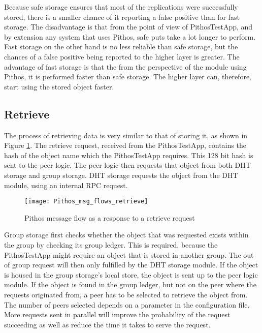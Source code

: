 Because safe storage ensures that most of the replications were successfully stored, there is a smaller chance of it reporting a false positive than for fast storage. The disadvantage is that from the point of view of PithosTestApp, and by extension any system that uses Pithos, safe puts take a lot longer to perform. Fast storage on the other hand is no less reliable than safe storage, but the chances of a false positive being reported to the higher layer is greater. The advantage of fast storage is that the from the perspective of the module using Pithos, it is performed faster than safe storage. The higher layer can, therefore, start using the stored object faster.
\subsection{Retrieve}
   The process of retrieving data is very similar to that of storing it, as shown in Figure \ref{fig_pithos_msg_flow_retrieve}. The retrieve request, received from the PithosTestApp, contains the hash of the object name which the PithosTestApp requires. This 128 bit hash is sent to the peer logic. The peer logic then requests that object from both DHT storage and group storage. DHT storage requests the object from the DHT module, using an internal RPC request.

\begin{figure}[htbp]
 \centering
 \texttt{[image: Pithos\_msg\_flows\_retrieve]}
 \caption{Pithos message flow as a response to a retrieve request}
 \label{fig_pithos_msg_flow_retrieve}
\end{figure}

    Group storage first checks whether the object that was requested exists within the group by checking its group ledger. This is required, because the PithosTestApp might require an object that is stored in another group. The out of group request will then only fulfilled by the DHT storage module. If the object is housed in the group storage's local store, the object is sent up to the peer logic module. If the object is found in the group ledger, but not on the peer where the requests originated from, a peer has to be selected to retrieve the object from. The number of peers selected depends on a parameter in the configuration file. More requests sent in parallel will improve the probability of the request succeeding as well as reduce the time it takes to serve the request.

